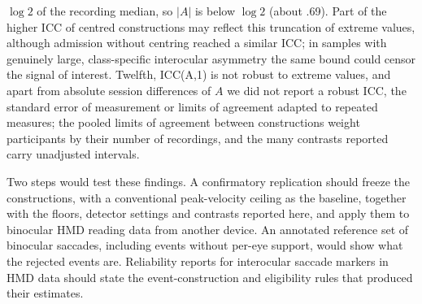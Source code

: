 $\log 2$ of the recording median, so $|A|$ is below $\log 2$ (about .69). Part of the higher ICC of centred constructions may reflect this truncation of extreme values, although admission without centring reached a similar ICC; in samples with genuinely large, class-specific interocular asymmetry the same bound could censor the signal of interest. Twelfth, ICC(A,1) is not robust to extreme values, and apart from absolute session differences of $A$ we did not report a robust ICC, the standard error of measurement or limits of agreement adapted to repeated measures; the pooled limits of agreement between constructions weight participants by their number of recordings, and the many contrasts reported carry unadjusted intervals.

Two steps would test these findings. A confirmatory replication should freeze the constructions, with a conventional peak-velocity ceiling as the baseline, together with the floors, detector settings and contrasts reported here, and apply them to binocular HMD reading data from another device. An annotated reference set of binocular saccades, including events without per-eye support, would show what the rejected events are. Reliability reports for interocular saccade markers in HMD data should state the event-construction and eligibility rules that produced their estimates.
